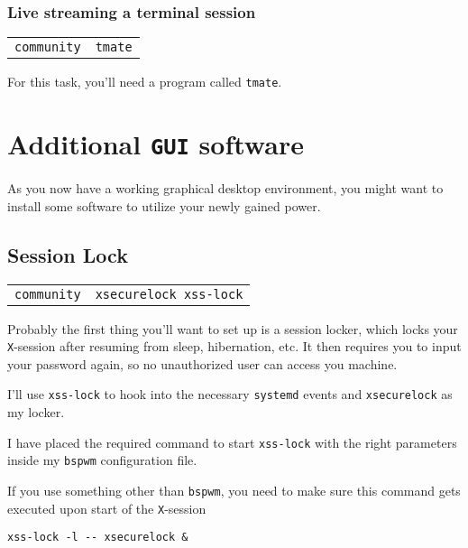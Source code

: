 \documentclass[9pt]{report}
\newenvironment{NOTE}
{\begin{tcolorbox}[colback=admonitionBG,coltitle=draculaFG,colframe=draculaBlue,colbacktitle=draculaBlue,title=NOTE]}
{\end{tcolorbox}}
\newenvironment{packagetable}
{\begin{longtabu}to \textwidth [b]{X[1,r]|X[1,l]}}
{\end{longtabu}}
\begin{document}
\newpage

\hypertarget{x-live-streaming-a-terminal-session}{\subsubsection{Live streaming a terminal session}}
\begin{packagetable}
    \texttt{community} & \texttt{tmate} \\ 
\end{packagetable}

For this task, you’ll need a program called \texttt{tmate}.



\newpage

\hypertarget{x-additional-gui-software}{\section{Additional \texttt{GUI} software}}
As you now have a working graphical desktop environment, you might want to install some software to utilize your newly gained power.



\newpage

\hypertarget{x-session-lock}{\subsection{Session Lock}}
\begin{packagetable}
    \texttt{community} & \texttt{xsecurelock xss-lock} \\ 
\end{packagetable}

Probably the first thing you’ll want to set up is a session locker, which locks your \texttt{X}-session after resuming from sleep, hibernation, etc.
It then requires you to input your password again, so no unauthorized user can access you machine.


I’ll use \texttt{xss-lock} to hook into the necessary \texttt{systemd} events and \texttt{xsecurelock} as my locker.


\begin{NOTE}
    I have placed the required command to start \texttt{xss-lock} with the right parameters inside my \texttt{bspwm} configuration file.


    If you use something other than \texttt{bspwm}, you need to make sure this command gets executed upon start of the \texttt{X}-session


    \begin{verbatim}
xss-lock -l -- xsecurelock &
    \end{verbatim}
\end{NOTE}
\end{document}
